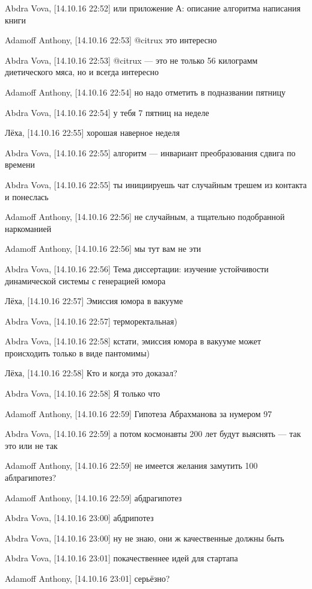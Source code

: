 Abdra Vova, [14.10.16 22:52]
или приложение А: описание алгоритма написания книги

Adamoff Anthony, [14.10.16 22:53]
@citrux это интересно

Abdra Vova, [14.10.16 22:53]
@citrux — это не только 56 килограмм диетического мяса, но и всегда интересно

Adamoff Anthony, [14.10.16 22:54]
но надо отметить в подназвании пятницу

Abdra Vova, [14.10.16 22:54]
у тебя 7 пятниц на неделе

Лёха, [14.10.16 22:55]
хорошая наверное неделя

Abdra Vova, [14.10.16 22:55]
алгоритм — инвариант преобразования сдвига по времени

Abdra Vova, [14.10.16 22:55]
ты инициируешь чат случайным трешем из контакта и понеслась

Adamoff Anthony, [14.10.16 22:56]
не случайным, а тщательно подобранной наркоманией

Adamoff Anthony, [14.10.16 22:56]
мы тут вам не эти

Abdra Vova, [14.10.16 22:56]
Тема диссертации: изучение устойчивости динамической системы с генерацией юмора

Лёха, [14.10.16 22:57]
Эмиссия юмора в вакууме

Abdra Vova, [14.10.16 22:57]
терморектальная)

Abdra Vova, [14.10.16 22:58]
кстати, эмиссия юмора в вакууме может происходить только в виде пантомимы)

Лёха, [14.10.16 22:58]
Кто и когда это доказал?

Abdra Vova, [14.10.16 22:58]
Я только что

Adamoff Anthony, [14.10.16 22:59]
Гипотеза Абрахманова за нумером 97

Abdra Vova, [14.10.16 22:59]
а потом космонавты 200 лет будут выяснять — так это или не так

Adamoff Anthony, [14.10.16 22:59]
не имеется желания замутить 100 аблрагипотез?

Adamoff Anthony, [14.10.16 22:59]
абдрагипотез

Abdra Vova, [14.10.16 23:00]
абдрипотез

Abdra Vova, [14.10.16 23:00]
ну не знаю, они ж качественные должны быть

Abdra Vova, [14.10.16 23:01]
покачественнее идей для стартапа

Adamoff Anthony, [14.10.16 23:01]
серьёзно?

